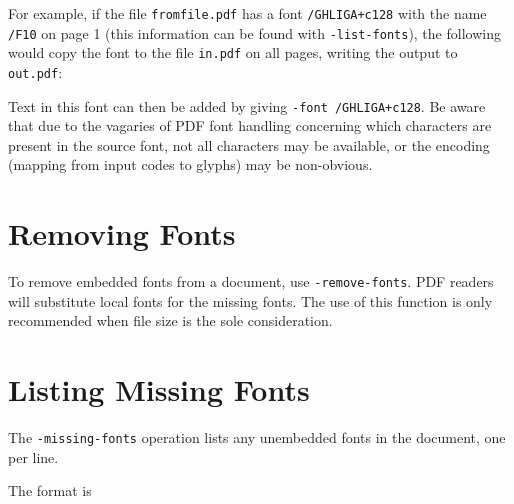 \documentclass{book}
\begin{document}
For example, if the file \verb!fromfile.pdf! has a font \verb!/GHLIGA+c128! with
the name \verb!/F10! on page 1 (this information can be found with
\verb!-list-fonts!), the following would copy the font to the file
\verb!in.pdf! on all pages, writing the output to \verb!out.pdf!:

\noindent{}

\noindent Text in this font can then be added by giving \verb!-font /GHLIGA+c128!. Be
aware that due to the vagaries of PDF font handling concerning which characters
are present in the source font, not all characters may be available, or the
encoding (mapping from input codes to glyphs) may be non-obvious.

\section{Removing Fonts}
\label{removefont}

To remove embedded fonts from a document, use \verb!-remove-fonts!. PDF readers will
substitute local fonts for the missing fonts. The use of this function is only
recommended when file size is the sole consideration.

\noindent{}

\section{Listing Missing Fonts}
  The \verb!-missing-fonts! operation lists any unembedded fonts in the document, one per line.

\noindent{}

  \noindent The format is

\noindent{}
\end{document}
